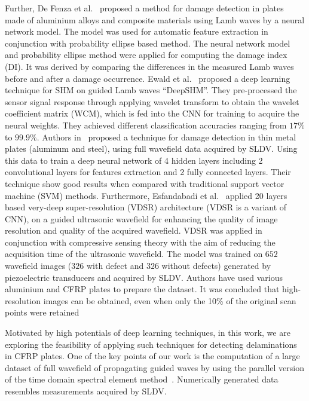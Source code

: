 \documentclass[preprint,9pt]{elsarticle}
\begin{document}
Further, De Fenza et al.~\cite{de2015application} proposed a method for damage detection in plates made of aluminium alloys and composite materials using Lamb waves by a neural network model.
The model was used for automatic feature extraction in conjunction with probability ellipse based method. 
The neural network model and probability ellipse method were applied for computing the damage index (DI). 
It was derived by comparing the differences in the measured  Lamb waves before and after a damage occurrence. 
Ewald et al.~\cite{ewald2019deepshm} proposed a deep learning technique for SHM on guided Lamb waves \enquote{DeepSHM}. 
They pre-processed the sensor signal response through applying wavelet transform to obtain the wavelet coefficient matrix (WCM), which is fed into the CNN for training to acquire the neural weights. 
They achieved different classification accuracies ranging from \(17\%\) to \(99.9\%\).
Authors in~\cite{Melville2018} proposed a technique for damage detection in thin metal plates (aluminum and steel), using full wavefield data acquired by SLDV. 
Using this data to train a deep neural network of 4 hidden layers including 2 convolutional layers for features extraction and 2 fully connected layers. 
Their technique show good results when compared with traditional support vector machine (SVM) methods.
Furthermore, Esfandabadi et al.~\cite{esfandabadideep} applied 20 layers based very-deep super-resolution (VDSR) architecture (VDSR is a variant of CNN), on a guided ultrasonic wavefield for enhancing the quality of image resolution and quality of the acquired wavefield. 
VDSR was applied in conjunction with compressive sensing theory with the aim of reducing the acquisition time of the ultrasonic wavefield.
The model was trained on \(652\) wavefield images (\(326\) with defect and \(326\) without defects) generated by piezoelectric transducers and acquired by SLDV. 
Authors have used various aluminium and CFRP plates to prepare the dataset.
It was concluded that high-resolution images can be obtained, even when only the 10\% of the original scan points were retained

Motivated by high potentials of deep learning techniques, in this work, we are exploring the feasibility of applying such techniques for detecting delaminations in CFRP plates. 
One of the key points of our work is the computation of a large dataset of full wavefield of propagating guided waves by using the parallel version of the time domain spectral element method~\cite{Kudela2020}. 
Numerically generated data resembles measurements acquired by SLDV. 
	
\end{document}
